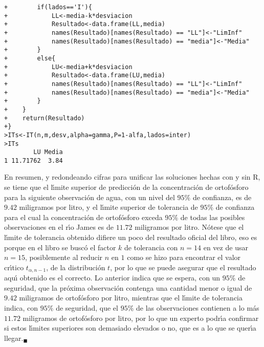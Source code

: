 \begin{solucion}
\begin{verbatim}
+        if(lados=='I'){
+            LL<-media-k*desviacion
+            Resultado<-data.frame(LL,media)
+            names(Resultado)[names(Resultado) == "LL"]<-"LimInf"
+            names(Resultado)[names(Resultado) == "media"]<-"Media"
+        }
+        else{
+            LU<-media+k*desviacion
+            Resultado<-data.frame(LU,media)
+            names(Resultado)[names(Resultado) == "LL"]<-"LimInf"
+            names(Resultado)[names(Resultado) == "media"]<-"Media"
+        }
+    }
+    return(Resultado)
+}
>ITs<-IT(n,m,desv,alpha=gamma,P=1-alfa,lados=inter)
>ITs
        LU Media
1 11.71762  3.84
 \end{verbatim}
 \vspace{-0.5cm}
 En resumen, y redondeando cifras para unificar las soluciones hechas con y sin R, se tiene que el l\'{\i}mite superior de predicci\'on de la concentraci\'on de ortof\'osforo para la siguiente observaci\'on de agua, con un nivel del $95\%$ de confianza, es de $9.42$ miligramos por litro, y el l\'{\i}mite superior de tolerancia de $95\%$ de confianza para el cual la concentraci\'on de ortof\'osforo exceda $95\%$ de todas las posibles observaciones en el r\'{\i}o James es de $11.72$ miligramos por litro. N\'otese que el l\'{\i}mite de tolerancia obtenido difiere un poco del resultado oficial del libro, eso es porque en el libro se busc\'o el factor $k$ de tolerancia con $n=14$ en vez de usar $n=15$, posiblemente al reducir $n$ en $1$ como se hizo para encontrar el valor cr\'{\i}tico $t_{\alpha,n-1}$, de la distribuci\'on $t$, por lo que se puede asegurar que el resultado aqu\'{\i} obtenido es el correcto. Lo anterior indica que se espera, con un $95\%$ de seguridad, que la pr\'oxima observaci\'on contenga una cantidad menor o igual de $9.42$ miligramos de ortof\'osforo por litro, mientras que el l\'{\i}mite de tolerancia indica, con $95\%$ de seguridad, que el $95\%$ de las observaciones contienen a lo m\'as $11.72$ miligramos de ortof\'osforo por litro, por lo que un experto podr\'{\i}a confirmar si estos l\'{\i}mites superiores son demasiado elevados o no, que es a lo que se quer\'{\i}a llegar.${}_{\blacksquare}$
\end{solucion}
